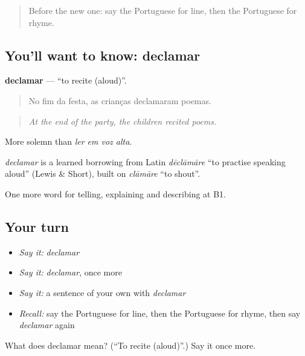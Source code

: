 \label{lesson:PT-C524-declamar}



\begin{quote}
Before the new one: say the Portuguese for line, then the Portuguese for rhyme.
\end{quote}

\subsection*{You'll want to know: declamar}
\textbf{declamar} — \textquotedblleft{}to recite (aloud)\textquotedblright{}.

\begin{quote}
No fim da festa, as crianças declamaram poemas.
\end{quote}

\begin{quote}
\emph{At the end of the party, the children recited poems.}
\end{quote}

More solemn than \emph{ler em voz alta}.

\begin{cousinweb}
\emph{declamar} is a learned borrowing from Latin \emph{dēclāmāre} \textquotedblleft{}to practise speaking aloud\textquotedblright{} (Lewis \& Short), built on \emph{clāmāre} \textquotedblleft{}to shout\textquotedblright{}.
\end{cousinweb}

\begin{grammarlens}[title={What you've built}]
One more word for telling, explaining and describing at B1.
\end{grammarlens}

\subsection*{Your turn}
\begin{itemize}
\raggedright
  \item \emph{Say it:} \emph{declamar}
  \item \emph{Say it:} \emph{declamar}, once more
  \item \emph{Say it:} a sentence of your own with \emph{declamar}
  \item \emph{Recall:} say the Portuguese for line, then the Portuguese for rhyme, then say \emph{declamar} again
\end{itemize}

\begin{tcolorbox}[breakable,colback=teal!4,colframe=teal!35!black,title={Before you move on}]
What does declamar mean? (\textquotedblleft{}To recite (aloud)\textquotedblright{}.) Say it once more.
\end{tcolorbox}
